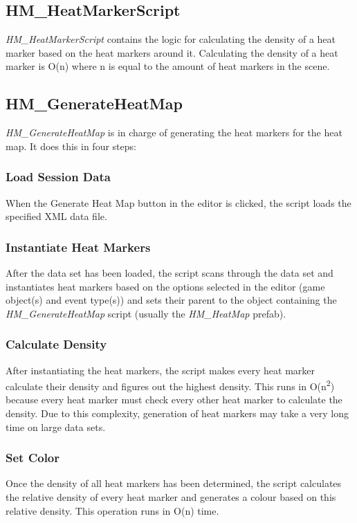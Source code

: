\subsection{HM\_HeatMarkerScript}
\label{CO_HMS}
\textit{HM\_HeatMarkerScript} contains the logic for calculating the density of a heat marker based on the heat markers around it. Calculating the density of a heat marker is O(n) where n is equal to the amount of heat markers in the scene.

\subsection{HM\_GenerateHeatMap}
\label{CO_GHM}
\textit{HM\_GenerateHeatMap} is in charge of generating the heat markers for the heat map. It does this in four steps:
\subsubsection{Load Session Data}
When the Generate Heat Map button in the editor is clicked, the script loads the specified XML data file.
\subsubsection{Instantiate Heat Markers}
After the data set has been loaded, the script scans through the data set and instantiates heat markers based on the options selected in the editor (game object(s) and event type(s)) and sets their parent to the object containing the \textit{HM\_GenerateHeatMap} script (usually the \textit{HM\_HeatMap} prefab).
\subsubsection{Calculate Density}
\label{CO_GHM_CD}
After instantiating the heat markers, the script makes every heat marker calculate their density and figures out the highest density. This runs in O(n\textsuperscript{2}) because every heat marker must check every other heat marker to calculate the density. Due to this complexity, generation of heat markers may take a very long time on large data sets.
\subsubsection{Set Color}
Once the density of all heat markers has been determined, the script calculates the relative density of every heat marker and generates a colour based on this relative density. This operation runs in O(n) time.

